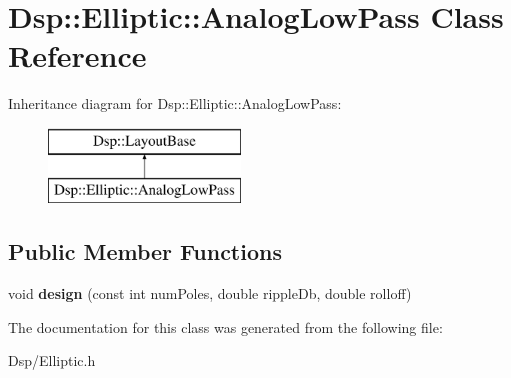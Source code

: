 \hypertarget{classDsp_1_1Elliptic_1_1AnalogLowPass}{\section{Dsp\-:\-:Elliptic\-:\-:Analog\-Low\-Pass Class Reference}
\label{classDsp_1_1Elliptic_1_1AnalogLowPass}
}
Inheritance diagram for Dsp\-:\-:Elliptic\-:\-:Analog\-Low\-Pass\-:\begin{figure}[H]
\begin{center}
\leavevmode
\includegraphics[height=2.000000cm]{classDsp_1_1Elliptic_1_1AnalogLowPass}
\end{center}
\end{figure}
\subsection*{Public Member Functions}
\begin{DoxyCompactItemize}
\item 
\hypertarget{classDsp_1_1Elliptic_1_1AnalogLowPass_ad98a077ae53b8720e60f6ba4c0c890d5}{void {\bfseries design} (const int num\-Poles, double ripple\-Db, double rolloff)}\label{classDsp_1_1Elliptic_1_1AnalogLowPass_ad98a077ae53b8720e60f6ba4c0c890d5}

\end{DoxyCompactItemize}


The documentation for this class was generated from the following file\-:\begin{DoxyCompactItemize}
\item 
Dsp/Elliptic.\-h\end{DoxyCompactItemize}
